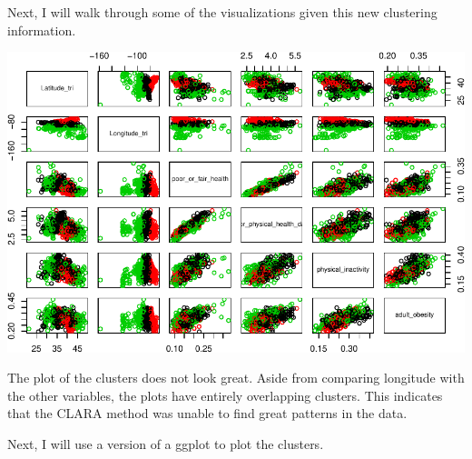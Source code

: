 \documentclass[12pt,twoside]{amherstthesis}
\begin{document}
  Next, I will walk through some of the visualizations given this new
  clustering information.
  
  \begin{Shaded}
  \begin{Highlighting}[]
  \OperatorTok{$}
  \OperatorTok{$} \OperatorTok{:}\NormalTok{, } \NormalTok{)}
  \end{Highlighting}
  \end{Shaded}
  
  \begin{center}\includegraphics{Comps_Proj_files/figure-latex/unnamed-chunk-9-1} \end{center}
  
  The plot of the clusters does not look great. Aside from comparing
  longitude with the other variables, the plots have entirely overlapping
  clusters. This indicates that the CLARA method was unable to find great
  patterns in the data.
  
  Next, I will use a version of a ggplot to plot the clusters.
  
  \begin{Shaded}
  \begin{Highlighting}[]
  \OperatorTok{::}
  \end{Highlighting}
  \end{Shaded}
  
\end{document}
